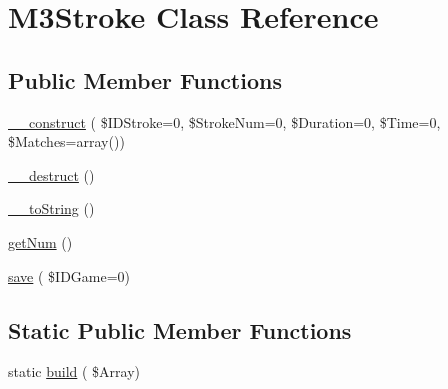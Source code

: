 \hypertarget{class_m3_stroke}{}\section{M3\+Stroke Class Reference}
\label{class_m3_stroke}
\subsection*{Public Member Functions}
\begin{DoxyCompactItemize}
\item 
\hyperlink{class_m3_stroke_ad6d724aa8f899efc6a413277454bb2ec}{\+\_\+\+\_\+construct} ( \$I\+D\+Stroke=0, \$Stroke\+Num=0, \$Duration=0, \$Time=0, \$Matches=array())
\item 
\hyperlink{class_m3_stroke_ae6ccf3c65b84509cf8a37cfaaf11292d}{\+\_\+\+\_\+destruct} ()
\item 
\hyperlink{class_m3_stroke_aee60e7a145ea3b9aff3330f1b09c7527}{\+\_\+\+\_\+to\+String} ()
\item 
\hyperlink{class_m3_stroke_a5bb3f9ded8ee67731a90a464bd33ecea}{get\+Num} ()
\item 
\hyperlink{class_m3_stroke_a3539e375dbcdb90b0ffd2a666b9463a7}{save} ( \$I\+D\+Game=0)
\end{DoxyCompactItemize}
\subsection*{Static Public Member Functions}
\begin{DoxyCompactItemize}
\item 
static \hyperlink{class_m3_stroke_a0a5e6074f1d4319f4af7cddca3565362}{build} ( \$Array)
\end{DoxyCompactItemize}
